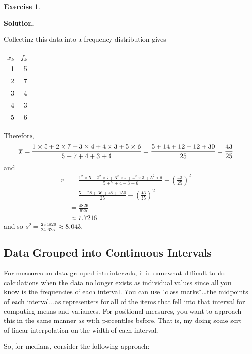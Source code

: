 \documentclass[10pt,]{book}
\theoremstyle{plain}
\theoremstyle{definition}
\theoremstyle{definition}
\theoremstyle{definition}
\newtheorem{exercise}[theorem]{Exercise}
\numberwithin{equation}{section}
\newcommand{\hrulemedium}{\noalign{\hrule height 0.07em}}
\begin{document}
%
\begin{exercise}\label{exercise-2}
\par\smallskip
\noindent\textbf{Solution.}\hypertarget{solution-3}{}\quad

	Collecting this data into a frequency distribution gives
	\leavevmode%
\begin{table}
\centering
\begin{tabular}{rr}
\(x_k\)&\(f_k\)\tabularnewline\hrulemedium
1&5\tabularnewline[0pt]
2&7\tabularnewline[0pt]
3&4\tabularnewline[0pt]
4&3\tabularnewline[0pt]
5&6
\end{tabular}
\end{table}

	Therefore, 
		\begin{equation*}
		\overline{x} = \frac{1 \times 5 + 2 \times 7 + 3 \times 4 + 4 \times 3 + 5 \times 6}{5+7+4+3+6} \\
		= \frac{5 + 14 + 12 + 12 + 30}{25} = \frac{43}{25}
		\end{equation*}
	and 
		\begin{align*}
v & = \frac{1^2 \times 5 + 2^2 \times 7 + 3^2 \times 4 + 4^2 \times 3 + 5^2 \times 6}{5+7+4+3+6} - \left ( \frac{43}{25} \right )^2 \\
 & = \frac{5 + 28 + 36 + 48 + 150}{25} - \left ( \frac{43}{25} \right )^2 \\
 & = \frac{4826}{625}\\
 & \approx 7.7216
\end{align*}
	and so \(s^2 = \frac{25}{24} \frac{4826}{625} \approx 8.043\). 
\end{exercise}
\typeout{************************************************}
\typeout{************************************************}
\subsection[{Data Grouped into Continuous Intervals}]{Data Grouped into Continuous Intervals}\label{subsection-2}
For measures on data grouped into intervals, it is somewhat difficult to do calculations when the data no longer exists as individual values since all you know is the frequencies of each interval. You can use "class marks"...the midpoints of each interval...as representers for all of the items that fell into that interval for computing means and variances.  For positional measures, you want to approach this in the same manner as with percentiles before.  That is, my doing some sort of linear interpolation on the width of each interval.
%
\par
So, for medians, consider the following approach:
%
\par
\end{document}
